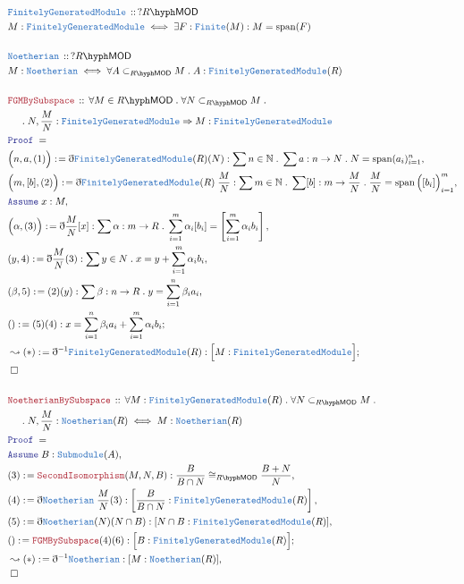 \documentclass[12pt]{scrartcl}
\newcommand{\TYPE}[1]{\textcolor{NavyBlue}{\mathtt{#1}}}
\newcommand{\LOGIC}[1]{\textcolor{Blue}{\mathtt{#1}}}
\newcommand{\THM}[1]{\textcolor{Maroon}{\mathtt{#1}}}
\renewcommand{\.}{\; . \;}
\newcommand{\de}{: \kern 0.1pc =}
\newcommand{\Theorem}[2]{& \THM{#1} \, :: \, #2 \\ & \Proof = \\ }
\newcommand{\DeclareType}[2]{& \TYPE{#1} \, :: \, #2 \\}
\newcommand{\DefineType}[3]{& #1 : \TYPE{#2} \iff #3 \\}
\newcommand{\NewLine}{\\ & \kern 1pc}
\newcommand{\Page}[1]{ \begin{align*} #1 \end{align*}   }
\newcommand{ \bd }{ \ByDef }
\newcommand{\Nat}{\mathbb{N} }
\newcommand{\Say}[3]{& #1 \de #2 : #3, \\}
\newcommand{\Conclude}[3]{& #1 \de #2 : #3; \\}
\newcommand{\Derive}[3]{& \leadsto #1 \de #2 : #3, \\}
\newcommand{\DeriveConclude}[3]{& \leadsto #1 \de #2 : #3 ; \\}
\newcommand{\Assume}[2]{& \LOGIC{Assume} \; #1 : #2, \\}
\newcommand{\QED}{\; \square}
\newcommand{\EndProof}{& \QED \\}
\newcommand{\ByDef}{\eth}
\newcommand{\Proof}{\LOGIC{Proof} \; }
\newcommand{\submod}[1]{\subset_{\LMOD{#1}}}
\newcommand{\FGM}{\TYPE{FinitelyGeneratedModule}}
\DeclareMathOperator{\Span}{span}
\newcommand{\LMOD}[1]{#1\hyph\mathsf{MOD}}
\begin{document}
\Page{
	\DeclareType{\FGM}{?\LMOD{R}}
	\DefineType{M}{\FGM}{\exists F : \TYPE{Finite}(M) : M = \Span(F)}
	\\
	\DeclareType{Noetherian}{?\LMOD{R}}
	\DefineType{M}{Noetherian}{\forall A \submod{R} M \. A : \FGM(R) }
	\\
	\Theorem{FGMBySubspace}{\forall M \in \LMOD{R} \. \forall N \submod{R} M \. \NewLine \. 
		 N,\frac{M}{N}  : \FGM  \Rightarrow M : \FGM }
	\Say{\Big(n,a,(1)\Big)}{\bd \FGM(R)(N)}{\sum n \in \Nat \. \sum a : n \to N \. N = \Span(a_i)^n_{i=1}}
	\Say{\Big(m,[b],(2)\Big)}{\bd \FGM(R) \; \frac{M}{N}}{\sum m \in \Nat \. \sum [b] : m \to \frac{M}{N} \. 
		\frac{M}{N} = \Span\Big([b_i]\Big)_{i=1}^m  }
	\Assume{x}{M}
	\Say{\Big(\alpha,(3)\Big)}{\bd \frac{M}{N}[x]}{\sum \alpha : m \to R \. 
		\sum^m_{i=1} \alpha_i[b_i] = \left[ \sum^m_{i=1} \alpha_i b_i \right]}
	\Say{(y,4)}{\bd \frac{M}{N}(3)}{\sum y \in N \. x = y + \sum^m_{i=1} \alpha_ib_i}
	\Say{(\beta,5)}{(2)(y)}{\sum \beta : n \to R \. y = \sum^n_{i=1} \beta_i a_i }
	\Conclude{()}{(5)(4)}{x = \sum^n_{i=1} \beta_i a_i + \sum^m_{i=1}\alpha_i b_i}
	\DeriveConclude{(*)}{\bd^{-1}\FGM(R)}{\Big[M : \FGM\Big] }
	\EndProof
	\\
	\Theorem{NoetherianBySubspace}{\forall M : \FGM(R) \. \forall N \submod{R} M \. \NewLine \. 
		 N,\frac{M}{N}  : \TYPE{Noetherian}(R)  \iff M : \TYPE{Noetherian}(R) }
	\Assume{B}{\TYPE{Submodule}(A)}
	\Say{(3)}{\THM{SecondIsomorphism}(M,N,B)}{\frac{B}{B \cap N} \cong_{\LMOD{R}} \frac{B + N}{N}}
	\Say{(4)}{\bd \TYPE{Noetherian}\;\frac{M}{N}(3)}{\left[\frac{B}{B \cap N} : \FGM(R)\right]}
	\Say{(5)}{\bd \TYPE{Noetherian}(N)(N \cap B)}{ [N \cap B  : \FGM(R)]}
	\Conclude{()}{\THM{FGMBySubspace}(4)(6)}{\Big[ B : \FGM(R)  \Big]}
	\Derive{(*)}{\bd^{-1}\TYPE{Noetherian} }{[M : \TYPE{Noetherian}(R)]}
	\EndProof
}
\end{document}
